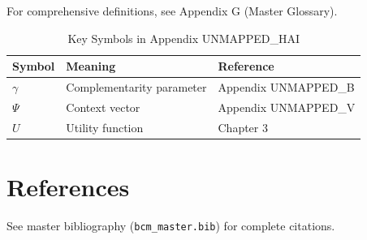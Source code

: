 For comprehensive definitions, see Appendix G (Master Glossary).

\begin{table}[htbp]
\centering
\caption{Key Symbols in Appendix UNMAPPED_HAI}
\begin{tabular}{lll}
\toprule
\textbf{Symbol} & \textbf{Meaning} & \textbf{Reference} \\
\midrule
$\gamma$ & Complementarity parameter & Appendix UNMAPPED_B \\
$\Psi$ & Context vector & Appendix UNMAPPED_V \\
$U$ & Utility function & Chapter 3 \\
\bottomrule
\end{tabular}
\end{table}


\section{References}
\label{sec:hai-references}

See master bibliography (\texttt{bcm\_master.bib}) for complete citations.

\nocite{bcm_master}

